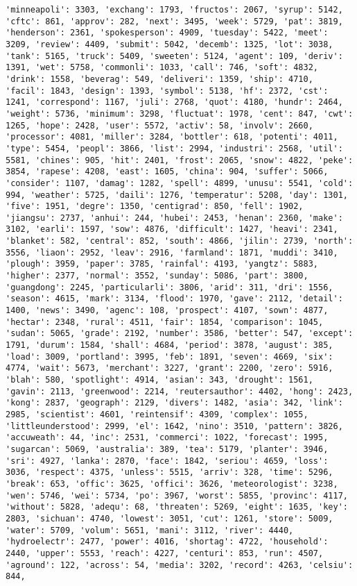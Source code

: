 \documentclass[11pt]{article}
\begin{document}
\begin{Verbatim}[commandchars=\\\{\}]
'minneapoli': 3303, 'exchang': 1793, 'fructos': 2067, 'syrup': 5142, 'cftc': 861, 'approv': 282, 'next': 3495, 'week': 5729, 'pat': 3819, 'henderson': 2361, 'spokesperson': 4909, 'tuesday': 5422, 'meet': 3209, 'review': 4409, 'submit': 5042, 'decemb': 1325, 'lot': 3038, 'tank': 5165, 'truck': 5409, 'sweeten': 5124, 'agent': 109, 'deriv': 1391, 'wet': 5758, 'commonli': 1033, 'call': 746, 'soft': 4832, 'drink': 1558, 'beverag': 549, 'deliveri': 1359, 'ship': 4710, 'facil': 1843, 'design': 1393, 'symbol': 5138, 'hf': 2372, 'cst': 1241, 'correspond': 1167, 'juli': 2768, 'quot': 4180, 'hundr': 2464, 'weight': 5736, 'minimum': 3298, 'fluctuat': 1978, 'cent': 847, 'cwt': 1265, 'hope': 2428, 'user': 5572, 'activ': 58, 'involv': 2660, 'processor': 4081, 'miller': 3284, 'bottler': 618, 'potenti': 4011, 'type': 5454, 'peopl': 3866, 'list': 2994, 'industri': 2568, 'util': 5581, 'chines': 905, 'hit': 2401, 'frost': 2065, 'snow': 4822, 'peke': 3854, 'rapese': 4208, 'east': 1605, 'china': 904, 'suffer': 5066, 'consider': 1107, 'damag': 1282, 'spell': 4899, 'unusu': 5541, 'cold': 994, 'weather': 5725, 'daili': 1276, 'temperatur': 5208, 'day': 1301, 'five': 1951, 'degre': 1350, 'centigrad': 850, 'fell': 1902, 'jiangsu': 2737, 'anhui': 244, 'hubei': 2453, 'henan': 2360, 'make': 3102, 'earli': 1597, 'sow': 4876, 'difficult': 1427, 'heavi': 2341, 'blanket': 582, 'central': 852, 'south': 4866, 'jilin': 2739, 'north': 3556, 'liaon': 2952, 'leav': 2916, 'farmland': 1871, 'muddi': 3410, 'plough': 3959, 'paper': 3785, 'rainfal': 4193, 'yangtz': 5883, 'higher': 2377, 'normal': 3552, 'sunday': 5086, 'part': 3800, 'guangdong': 2245, 'particularli': 3806, 'arid': 311, 'dri': 1556, 'season': 4615, 'mark': 3134, 'flood': 1970, 'gave': 2112, 'detail': 1400, 'news': 3490, 'agenc': 108, 'prospect': 4107, 'sown': 4877, 'hectar': 2348, 'rural': 4511, 'fair': 1854, 'comparison': 1045, 'sudan': 5065, 'grade': 2192, 'number': 3586, 'better': 547, 'except': 1791, 'durum': 1584, 'shall': 4684, 'period': 3878, 'august': 385, 'load': 3009, 'portland': 3995, 'feb': 1891, 'seven': 4669, 'six': 4774, 'wait': 5673, 'merchant': 3227, 'grant': 2200, 'zero': 5916, 'blah': 580, 'spotlight': 4914, 'asian': 343, 'drought': 1561, 'gavin': 2113, 'greenwood': 2214, 'reutersauthor': 4402, 'hong': 2423, 'kong': 2837, 'geograph': 2129, 'divers': 1482, 'asia': 342, 'link': 2985, 'scientist': 4601, 'reintensif': 4309, 'complex': 1055, 'littleunderstood': 2999, 'el': 1642, 'nino': 3510, 'pattern': 3826, 'accuweath': 44, 'inc': 2531, 'commerci': 1022, 'forecast': 1995, 'sugarcan': 5069, 'australia': 389, 'tea': 5179, 'planter': 3946, 'sri': 4927, 'lanka': 2870, 'face': 1842, 'seriou': 4659, 'loss': 3036, 'respect': 4375, 'unless': 5515, 'arriv': 328, 'time': 5296, 'break': 653, 'offic': 3625, 'offici': 3626, 'meteorologist': 3238, 'wen': 5746, 'wei': 5734, 'po': 3967, 'worst': 5855, 'provinc': 4117, 'without': 5828, 'adequ': 68, 'threaten': 5269, 'eight': 1635, 'key': 2803, 'sichuan': 4740, 'lowest': 3051, 'cut': 1261, 'store': 5009, 'water': 5709, 'volum': 5651, 'mani': 3112, 'river': 4440, 'hydroelectr': 2477, 'power': 4016, 'shortag': 4722, 'household': 2440, 'upper': 5553, 'reach': 4227, 'centuri': 853, 'run': 4507, 'aground': 122, 'across': 54, 'media': 3202, 'record': 4263, 'celsiu': 844, 
\end{Verbatim}
\end{document}
